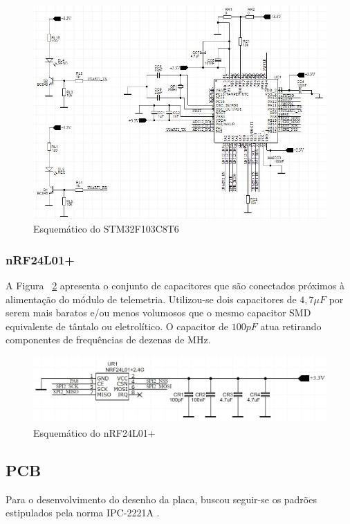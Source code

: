 \documentclass[
	12pt,				%
	openright,			%
	twoside,			%
	a4paper,			%
	english,			%
	french,				%
	spanish,			%
	brazil,				%
	]{abntex2}
\begin{document}
				\begin{figure}[!ht]
					\centering
					\includegraphics[width=\linewidth]{../Fotos/stmEsquematico.jpg}
					\caption{Esquemático do STM32F103C8T6}
					\label{fig:esquematicostm}
				\end{figure}

			\subsubsection{nRF24L01+}
				A Figura ~\ref{fig:esquematiconrf} apresenta o conjunto de capacitores que são
				conectados próximos à alimentação do módulo de telemetria.
				Utilizou-se dois capacitores de $4,7\mu F$ por serem mais
				baratos e/ou menos volumosos que o mesmo capacitor SMD
				equivalente de tântalo ou eletrolítico. O capacitor de
				$100pF$ atua retirando componentes de frequências de dezenas
				de MHz.

				\begin{figure}[!ht]
					\centering
					\includegraphics[width=\linewidth]{../Fotos/nrfEsquematico.jpg}
					\caption{Esquemático do nRF24L01+}
					\label{fig:esquematiconrf}
				\end{figure}
				
			\newpage
			\newpage


		\subsection{PCB}
			Para o desenvolvimento do desenho da placa, buscou seguir-se
			os padrões estipulados pela norma IPC-2221A \cite{ipc}.
\end{document}
